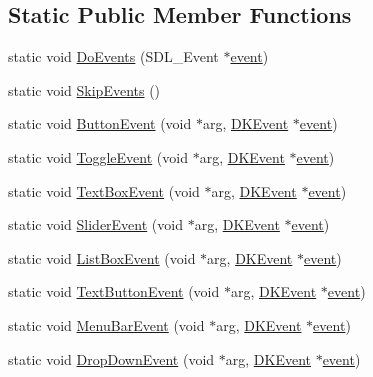 \subsection*{Static Public Member Functions}
\begin{DoxyCompactItemize}
\item 
static void \hyperlink{class_d_k_event_a65f8c58b756016f8424af8447b4a6905}{Do\-Events} (S\-D\-L\-\_\-\-Event $\ast$\hyperlink{class_d_k_event_a3deebb932ed734363c4ece87971bc45f}{event})
\item 
static void \hyperlink{class_d_k_event_a78e42460d99ebd9097b59bdc4b7f80cf}{Skip\-Events} ()
\item 
static void \hyperlink{class_d_k_event_af10c62bd55119142c44deeafcba7c3d7}{Button\-Event} (void $\ast$arg, \hyperlink{class_d_k_event}{D\-K\-Event} $\ast$\hyperlink{class_d_k_event_a3deebb932ed734363c4ece87971bc45f}{event})
\item 
static void \hyperlink{class_d_k_event_a4ee2ed8c0ba90927771fe90d253da57d}{Toggle\-Event} (void $\ast$arg, \hyperlink{class_d_k_event}{D\-K\-Event} $\ast$\hyperlink{class_d_k_event_a3deebb932ed734363c4ece87971bc45f}{event})
\item 
static void \hyperlink{class_d_k_event_af6fca64892a14303e96e77831c06dde6}{Text\-Box\-Event} (void $\ast$arg, \hyperlink{class_d_k_event}{D\-K\-Event} $\ast$\hyperlink{class_d_k_event_a3deebb932ed734363c4ece87971bc45f}{event})
\item 
static void \hyperlink{class_d_k_event_a9baf4474717a37b04e6f2cec78bfa699}{Slider\-Event} (void $\ast$arg, \hyperlink{class_d_k_event}{D\-K\-Event} $\ast$\hyperlink{class_d_k_event_a3deebb932ed734363c4ece87971bc45f}{event})
\item 
static void \hyperlink{class_d_k_event_aea5143b78f3e3ac487f8913ec3af1749}{List\-Box\-Event} (void $\ast$arg, \hyperlink{class_d_k_event}{D\-K\-Event} $\ast$\hyperlink{class_d_k_event_a3deebb932ed734363c4ece87971bc45f}{event})
\item 
static void \hyperlink{class_d_k_event_a8f7ae45d76194181ee72d85e364faeca}{Text\-Button\-Event} (void $\ast$arg, \hyperlink{class_d_k_event}{D\-K\-Event} $\ast$\hyperlink{class_d_k_event_a3deebb932ed734363c4ece87971bc45f}{event})
\item 
static void \hyperlink{class_d_k_event_abdfd544e92336d126c9ce325c8669191}{Menu\-Bar\-Event} (void $\ast$arg, \hyperlink{class_d_k_event}{D\-K\-Event} $\ast$\hyperlink{class_d_k_event_a3deebb932ed734363c4ece87971bc45f}{event})
\item 
static void \hyperlink{class_d_k_event_ac3a9913b5da26575a6729fda66f3122f}{Drop\-Down\-Event} (void $\ast$arg, \hyperlink{class_d_k_event}{D\-K\-Event} $\ast$\hyperlink{class_d_k_event_a3deebb932ed734363c4ece87971bc45f}{event})

\end{DoxyCompactItemize}

